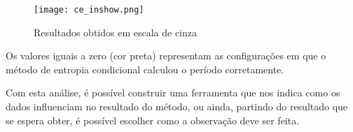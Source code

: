 \begin{figure}[H]
\centering
\hspace{-2.5cm}\texttt{[image: ce\_inshow.png]}
\label{fig:imshow}
\caption{Resultados obtidos em escala de cinza}
\end{figure}

Os valores iguais a zero (cor preta) representam as configurações em que o método de entropia condicional calculou o período corretamente.

Com esta análise, é possível construir uma ferramenta que nos indica como os dados influenciam no resultado do método, ou ainda, partindo do resultado que se espera obter, é possível escolher como a observação deve ser feita.